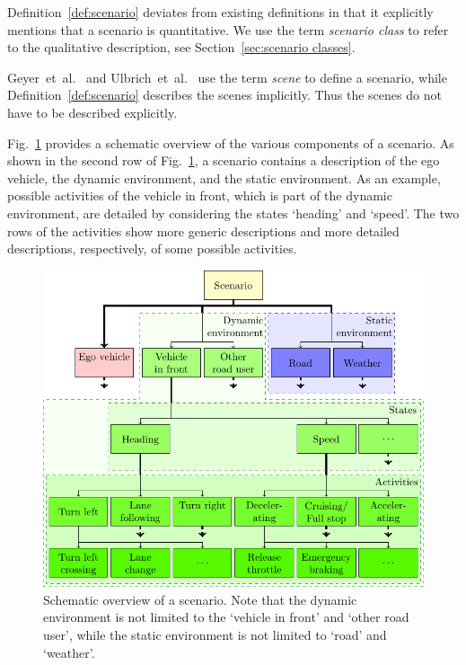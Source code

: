 Definition~\ref{def:scenario} deviates from existing definitions \cite{geyer2014, ulbrich2015, elrofai2016scenario} in that it explicitly mentions that a scenario is quantitative. We use the term \emph{scenario class} to refer to the qualitative description, see Section~\ref{sec:scenario classes}.

Geyer~et~al.~\cite{geyer2014} and Ulbrich~et~al.~\cite{ulbrich2015} use the term \emph{scene} to define a scenario, while Definition~\ref{def:scenario} describes the scenes implicitly. Thus the scenes do not have to be described explicitly.

Fig.~\ref{fig:scenario} provides a schematic overview of the various components of a scenario. As shown in the second row of Fig.~\ref{fig:scenario}, a scenario contains a description of the ego vehicle, the dynamic environment, and the static environment. As an example, possible activities of the vehicle in front, which is part of the dynamic environment, are detailed by considering the states `heading' and `speed'. The two rows of the activities show more generic descriptions and more detailed descriptions, respectively, of some possible activities.

\begin{figure}
	\centering
	\includegraphics[width=\linewidth]{figures/scenario.pdf}
	\caption{Schematic overview of a scenario. Note that the dynamic environment is not limited to the `vehicle in front' and `other road user', while the static environment is not limited to `road' and `weather'.}
	\label{fig:scenario}
	\spaceaftercaption
\end{figure}
